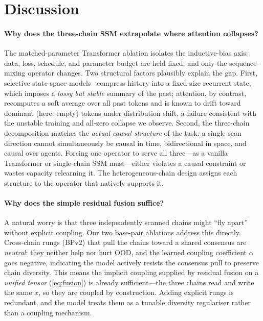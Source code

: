 \section{Discussion}
\label{sec:discuss}

\paragraph{Why does the three-chain SSM extrapolate where attention collapses?}
The matched-parameter Transformer ablation isolates the inductive-bias axis:
data, loss, schedule, and parameter budget are held fixed, and only the
sequence-mixing operator changes. Two structural factors plausibly explain the
gap. First, selective state-space models~\cite{mamba,mamba2} compress history
into a fixed-size recurrent state, which imposes a \emph{lossy but stable}
summary of the past; attention, by contrast, recomputes a soft average over all
past tokens and is known to drift toward dominant (here: empty) tokens under
distribution shift, a failure consistent with the unstable training and
all-zero collapse we observe. Second, the three-chain decomposition matches the
\emph{actual causal structure} of the task: a single scan direction cannot
simultaneously be causal in time, bidirectional in space, and causal over
agents. Forcing one operator to serve all three---as a vanilla Transformer or
single-chain SSM must---either violates a causal constraint or wastes capacity
relearning it. The heterogeneous-chain design assigns each structure to the
operator that natively supports it.

\paragraph{Why does the simple residual fusion suffice?}
A natural worry is that three independently scanned chains might ``fly apart''
without explicit coupling. Our two base-pair ablations address this directly.
Cross-chain rungs (BPv2) that pull the chains toward a shared consensus are
\emph{neutral}: they neither help nor hurt OOD, and the learned coupling
coefficient $\alpha$ goes negative, indicating the model actively resists the
consensus pull to preserve chain diversity. This means the implicit coupling
supplied by residual fusion on a \emph{unified tensor} (\cref{eq:fusion}) is
already sufficient---the three chains read and write the same $x$, so they are
coupled by construction. Adding explicit rungs is redundant, and the model
treats them as a tunable diversity regulariser rather than a coupling
mechanism.

